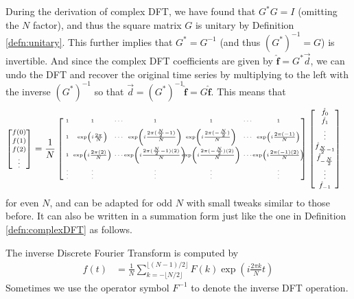 During the derivation of complex DFT, we have found that $G^*G = I$ (omitting the $N$ factor), and thus the square matrix $G$ is unitary by Definition \ref{defn:unitary}. This further implies that $G^* = G^{-1}$ (and thus $(G^*)^{-1} = G$) is invertible. And since the complex DFT coefficients are given by $\hat{\textbf{f}} = G^*\vec{d}$, we can undo the DFT and recover the original time series by multiplying to the left with the inverse $(G^*)^{-1}$ so that $\vec{d} = (G^*)^{-1}\hat{\textbf{f}} = G \hat{\textbf{f}}$. This means that
\begin{align}
\scriptsize
\begin{bmatrix}
f(0) \\
f(1) \\
f(2) \\
\vdots
\end{bmatrix}    
&= 
\frac{1}{N}
\tiny
\left[\begin{array}{@{\,}wc{6pt}wc{28pt}wc{8pt}wc{50pt}wc{50pt}wc{8pt}wc{38pt}}
1 & 1 & \cdots & 1 & 1 & \cdots & 1 \\[5pt]
1 & \exp(i\frac{2\pi}{N}) & \cdots & \exp(i\frac{2\pi(\frac{N}{2}-1)}{N}) & \exp(i\frac{2\pi(-\frac{N}{2})}{N}) & \cdots & \exp(i\frac{2\pi(-1)}{N}) \\[7pt]
1 & \exp(i\frac{2\pi(2)}{N}) & \cdots & \exp(i\frac{2\pi(\frac{N}{2}-1)(2)}{N}) & \exp(i\frac{2\pi(-\frac{N}{2})(2)}{N}) & \cdots & \exp(i\frac{2\pi(-1)(2)}{N}) \\[7pt]
\vdots & \vdots &  & \vdots & \vdots & & \vdots \\
\end{array}\right]
\scriptsize
\renewcommand\arraystretch{1.15}
\begin{bmatrix}
\hat{f}_0 \\
\hat{f}_1 \\
\vdots \\
\hat{f}_{\frac{N}{2}-1} \\
\hat{f}_{-\frac{N}{2}} \\
\vdots \\
\hat{f}_{-1}
\end{bmatrix}
\end{align}
for even $N$, and can be adapted for odd $N$ with small tweaks similar to those before. It can also be written in a summation form just like the one in Definition \ref{defn:complexDFT} as follows.
\begin{defn}
\label{defn:iDFT}
The inverse Discrete Fourier Transform is computed by
\begin{align}
f(t) &= \frac{1}{N}\sum_{k= -\lfloor N/2 \rfloor}^{\lfloor (N-1)/2 \rfloor} F(k)\exp(i \frac{2\pi k}{N}t) \label{eqn:invDFT}
\end{align}
Sometimes we use the operator symbol $F^{-1}$ to denote the inverse DFT operation.
\end{defn}
